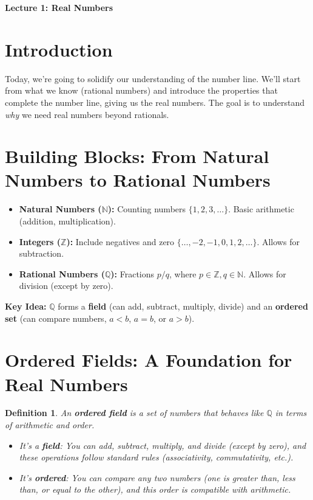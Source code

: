 \documentclass[12pt]{article}
\newtheorem{definition}{Definition}[section] %
\begin{document}
\begin{center}
    \textbf{\Large Lecture 1: Real Numbers}
\end{center}

\section*{Introduction}
Today, we're going to solidify our understanding of the number line. We'll start from what we know (rational numbers) and introduce the properties that complete the number line, giving us the real numbers. The goal is to understand \textit{why} we need real numbers beyond rationals.

\section{Building Blocks: From Natural Numbers to Rational Numbers}

\begin{itemize}
    \item \textbf{Natural Numbers ($\mathbb{N}$):} Counting numbers $\{1, 2, 3, \dots\}$. Basic arithmetic (addition, multiplication).
    \item \textbf{Integers ($\mathbb{Z}$):} Include negatives and zero $\{\dots, -2, -1, 0, 1, 2, \dots\}$. Allows for subtraction.
    \item \textbf{Rational Numbers ($\mathbb{Q}$):} Fractions $p/q$, where $p \in \mathbb{Z}, q \in \mathbb{N}$. Allows for division (except by zero).
\end{itemize}

\textbf{Key Idea:} $\mathbb{Q}$ forms a \textbf{field} (can add, subtract, multiply, divide) and an \textbf{ordered set} (can compare numbers, $a < b$, $a=b$, or $a > b$).

\section{Ordered Fields: A Foundation for Real Numbers}

\begin{definition}
An \textbf{ordered field} is a set of numbers that behaves like $\mathbb{Q}$ in terms of arithmetic and order.
\begin{itemize}
    \item It's a \textbf{field}: You can add, subtract, multiply, and divide (except by zero), and these operations follow standard rules (associativity, commutativity, etc.).
    \item It's \textbf{ordered}: You can compare any two numbers (one is greater than, less than, or equal to the other), and this order is compatible with arithmetic.
\end{itemize}
\end{definition}
\end{document}
